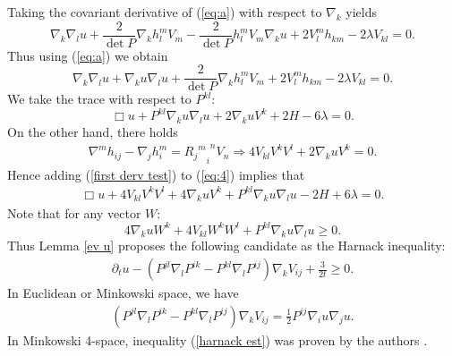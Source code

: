 \documentclass{amsart}
\theoremstyle{definition}
\theoremstyle{remark}
\numberwithin{equation}{section}
\begin{document}
Taking the covariant derivative of (\ref{eq:a}) with respect to $\nabla_k$ yields
\begin{equation*}
\nabla_k\nabla_lu+\frac{2}{\det P}\nabla_kh_l^mV_m-\frac{2}{\det P}h_l^mV_m\nabla_ku+2V_l^mh_{km}-2\lambda V_{kl}=0.
\end{equation*}
Thus using (\ref{eq:a}) we obtain
\begin{equation*}
\nabla_k\nabla_lu+\nabla_ku\nabla_lu+\frac{2}{\det P}\nabla_kh_l^mV_m+2V_l^mh_{km}-2\lambda V_{kl}=0.
\end{equation*}
We take the trace with respect to $P^{kl}:$
\begin{equation}\label{eq:4}
\Box u+P^{kl}\nabla_ku\nabla_lu+2\nabla_kuV^k+2H-6\lambda=0.
\end{equation}
On the other hand, there holds
\begin{align}\label{first derv test}
\nabla^mh_{ij}-\nabla_jh_i^m={{{R_j}^{m}}_{i}}^nV_n\Rightarrow 4V_{kl}V^kV^l+2\nabla_kuV^k=0.
\end{align}
Hence adding (\ref{first derv test}) to (\ref{eq:4}) implies that
\begin{align*}
\Box u+4V_{kl}V^kV^l+4\nabla_kuV^k+P^{kl} \nabla_ku\nabla_lu
-2H+6\lambda=0.
\end{align*}
Note that for any vector $W$:
\[4\nabla_k uW^k+4 V_{kl}W^kW^l+ P^{kl}\nabla_ku\nabla_lu\geq 0.\]
Thus Lemma \ref{ev u} proposes the following candidate as the  Harnack inequality:
 \begin{align}\label{harnack est}
\partial_tu-\left(P^{jl}\nabla_lP^{ik}-P^{kl}\nabla_l P^{ij}\right)\nabla_kV_{ij}+\frac{3}{2t}\geq 0.
\end{align}
In Euclidean or Minkowski space, we have
 \begin{align}\label{question}
 \left(P^{jl}\nabla_lP^{ik}-P^{kl}\nabla_l P^{ij}\right)\nabla_kV_{ij}=\frac{1}{2}P^{ij}\nabla_i u\nabla_j u.
 \end{align}
In Minkowski 4-space, inequality (\ref{harnack est}) was proven  by the authors \cite{BIS4}.
\end{document}
